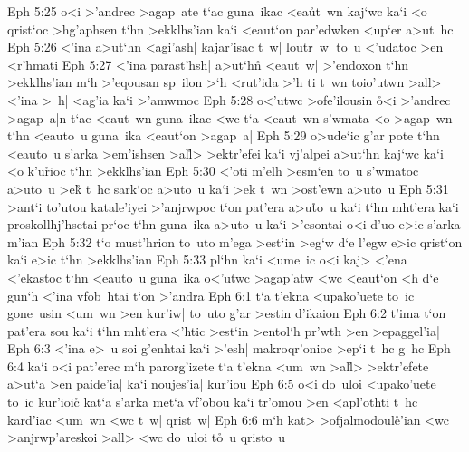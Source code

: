 \vs Eph 5:25
o<i
>'andrec
>agap~ate
t`ac
guna~ikac
<ea\r{u}t~wn
kaj`wc
ka`i
<o
qrist`oc
>hg'aphsen
t`hn
>ekklhs'ian
ka`i
<eaut`on
par'edwken
<up`er
a>ut~hc\bibvsend
\vs Eph 5:26
<'ina
a>ut`hn
<agi'ash|
kajar'isac
t~w|
loutr~w|
to~u
<'udatoc
>en
<r'hmati\bibvsend
\vs Eph 5:27
<'ina
parast'hsh|
a>ut`h\r{n}
<eaut~w|
>'endoxon
t`hn
>ekklhs'ian
m`h
>'eqousan
sp~ilon
>`h
<rut'ida
>'h
ti
t~wn
toio'utwn
>all>
<'ina
>~h|
<ag'ia
ka`i
>'amwmoc\bibvsend
\vs Eph 5:28
o<'utwc
>ofe'ilousin
\r{o}<i
>'andrec
>agap~a|n
t`ac
<eaut~wn
guna~ikac
<wc
t`a
<eaut~wn
s'wmata
<o
>agap~wn
t`hn
<eauto~u
guna~ika
<eaut`on
>agap~a|\bibvsend
\vs Eph 5:29
o>ude`ic
g'ar
pote
t`hn
<eauto~u
s'arka
>em'ishsen
>al\r{l}>
>ektr'efei
ka`i
vj'alpei
a>ut`hn
kaj`wc
ka`i
<o
k'u\r{r}ioc
t`hn
>ekklhs'ian\bibvsend
\vs Eph 5:30
<'oti
m'elh
>esm`en
to~u
s'wmatoc
a>uto~u
>ek\r{}
t~hc
sark`oc
a>uto~u
ka`i
>ek
t~wn
>ost'ewn
a>uto~u\bibvsend
\vs Eph 5:31
>ant`i
to'utou
katale'iyei
>'anjrwpoc
t`on
pat'era
a>u\r{t}o~u
ka`i
t`hn
mht'era
ka`i
proskollhj'hsetai
pr`oc
t`hn
guna~ika
a>uto~u
ka`i
>'esontai
o<i
d'uo
e>ic
s'arka
m'ian\bibvsend
\vs Eph 5:32
t`o
must'hrion
to~uto
m'ega
>est`in
>eg`w
d`e
l'egw
e>ic
qrist`on
ka`i
e>ic
t`hn
>ekklhs'ian\bibvsend
\vs Eph 5:33
pl`hn
ka`i
<ume~ic
o<i
kaj>
<'ena
<'ekastoc
t`hn
<eauto~u
guna~ika
o<'utwc
>agap'atw
<wc
<eaut`on
<h
d`e
gun`h
<'ina
vfob~htai
t`on
>'andra\bibvsend
\vs Eph 6:1
t`a
t'ekna
<upako'uete
to~ic
gone~usin
<um~wn
>en
kur'iw|
to~uto
g'ar
>estin
d'ikaion\bibvsend
\vs Eph 6:2
t'ima
t`on
pat'era
sou
ka`i
t`hn
mht'era
<'htic
>est`in
>entol`h
pr'wth
>en
>epaggel'ia|\bibvsend
\vs Eph 6:3
<'ina
e>~u
soi
g'enhtai
ka`i
>'esh|
makroqr'onioc
>ep`i
t~hc
g~hc\bibvsend
\vs Eph 6:4
ka`i
o<i
pat'erec
m`h
parorg'izete
t`a
t'ekna
<um~wn
>al\r{l}>
>ektr'efete
a>ut`a
>en
paide'ia|
ka`i
noujes'ia|
kur'iou\bibvsend
\vs Eph 6:5
o<i
do~uloi
<upako'uete
to~ic
kur'ioic\r{}
kat`a
s'arka
met`a
vf'obou
ka`i
tr'omou
>en
<apl'othti
t~hc
kard'iac
<um~wn
<wc
t~w|
qrist~w|\bibvsend
\vs Eph 6:6
m`h
kat>
>ofjalmodoul\r{e}'ian
<wc
>anjrwp'areskoi
>all>
<wc
do~uloi
t\r{o}~u
qristo~u
